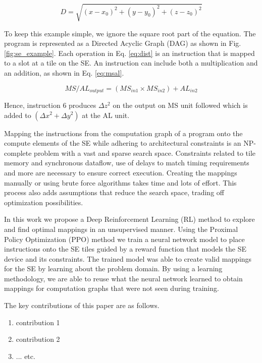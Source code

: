\begin{equation}
    \label{eq:dist}
    D = \sqrt{(x - x_0)^2 +(y - y_0)^2 + (z - z_0)^2}
\end{equation}

To keep this example simple, we ignore the square root part of the equation.
The program is represented as a Directed Acyclic Graph (DAG) as shown in Fig. \ref{fig:se_example}.
Each operation in Eq. \ref{eq:dist} is an instruction that is mapped to a slot at a tile on the SE.
An instruction can include both a multiplication and an addition, as shown in Eq. \ref{eq:msal}.

\begin{equation}
    \label{eq:msal}
    MS/AL_{output} = (MS_{in1} \times MS_{in2}) + AL_{in2} 
\end{equation}

Hence, instruction 6 produces $\Delta z^2$ on the output on MS unit followed which is added to $(\Delta x^2 + \Delta y^2)$ at the AL unit.


Mapping the instructions from the computation graph of a program onto the compute elements of the SE while adhering to architectural constraints is an NP-complete problem with a vast and sparse search space. 
Constraints related to tile memory and synchronous dataflow, use of delays to match timing requirements and more are necessary to ensure correct execution. 
Creating the mappings manually or using brute force algorithms takes time and lots of effort. 
This process also adds assumptions that reduce the search space, trading off optimization possibilities.  

In this work we propose a Deep Reinforcement Learning (RL) method to explore and find optimal mappings in an unsupervised manner. 
Using the Proximal Policy Optimization (PPO) method we train a neural network model to place instructions onto the SE tiles guided by a reward function that models the SE device and its constraints. 
The trained model was able to create valid mappings for the SE by learning about the problem domain. 
By using a learning methodology, we are able to reuse what the neural network learned to obtain mappings for computation graphs that were not seen during training.  


The key contributions of this paper are as follows.
\begin{enumerate}
    \item contribution 1
    \item contribution 2
    \item ... etc.
\end{enumerate}


